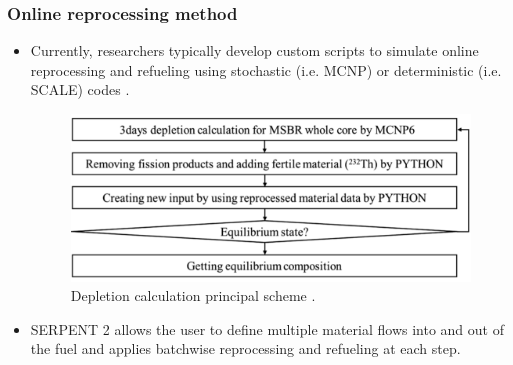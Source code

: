 \begin{frame}
\frametitle{Online reprocessing method}
	\begin{itemize}
		\item Currently, researchers typically develop custom scripts to simulate online reprocessing and refueling using stochastic (i.e. MCNP) or deterministic (i.e. SCALE) codes \cite{jeong_equilibrium_2016, powers_new_2013}.
		    \begin{figure}[t]
                \vspace*{-0.05in}
                 \includegraphics[height=0.30\textwidth]{./images/python_script.png}
                \vspace*{-0.05in}
                \caption{Depletion calculation principal scheme  \cite{park_whole_2015}.}
      \end{figure}
		\item SERPENT 2 allows the user to define multiple material flows into and out of the fuel and applies 								batchwise reprocessing and refueling at each step.
	\end{itemize}
\end{frame}

